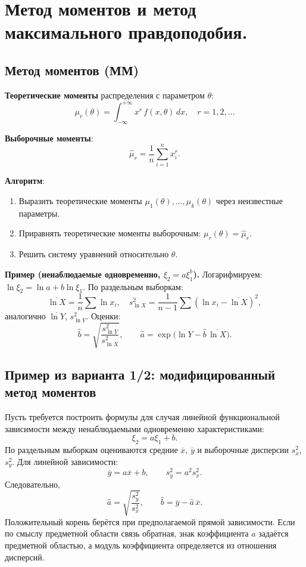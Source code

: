 \section{Метод моментов и метод максимального правдоподобия.}

\subsection*{Метод моментов (ММ)}

\textbf{Теоретические моменты} распределения с параметром $\theta$:
\[
  \mu_r(\theta) = \int_{-\infty}^{+\infty} x^r\,f(x,\theta)\,dx, \quad r = 1, 2, \ldots
\]

\textbf{Выборочные моменты}:
\[
  \hat{\mu}_r = \frac{1}{n}\sum_{i=1}^n x_i^r.
\]

\textbf{Алгоритм}:
\begin{enumerate}
  \item Выразить теоретические моменты $\mu_1(\theta),\ldots,\mu_k(\theta)$ через неизвестные параметры.
  \item Приравнять теоретические моменты выборочным: $\mu_r(\theta) = \hat{\mu}_r$.
  \item Решить систему уравнений относительно $\theta$.
\end{enumerate}

\textbf{Пример (ненаблюдаемые одновременно, $\xi_2 = a\xi_1^{b}$).}
Логарифмируем: $\ln\xi_2 = \ln a + b\ln\xi_1$. По раздельным выборкам:
\[
  \overline{\ln X} = \frac{1}{n}\sum \ln x_i, \quad
  s^2_{\ln X} = \frac{1}{n-1}\sum(\ln x_i - \overline{\ln X})^2,
\]
аналогично $\overline{\ln Y}$, $s^2_{\ln Y}$. Оценки:
\[
  \hat b = \sqrt{\frac{s^2_{\ln Y}}{s^2_{\ln X}}}, \qquad
  \hat a = \exp\!\bigl(\overline{\ln Y} - \hat b\,\overline{\ln X}\bigr).
\]

\subsection*{Пример из варианта 1/2: модифицированный метод моментов}

Пусть требуется построить формулы для случая линейной функциональной зависимости между ненаблюдаемыми одновременно характеристиками:
\[
  \xi_2 = a\xi_1 + b.
\]
По раздельным выборкам оцениваются средние $\overline{x}$, $\overline{y}$ и выборочные дисперсии $s_x^2$, $s_y^2$. Для линейной зависимости:
\[
  \overline{y} = a\overline{x} + b, \qquad
  s_y^2 = a^2s_x^2.
\]
Следовательно,
\[
  \hat a = \sqrt{\frac{s_y^2}{s_x^2}}, \qquad
  \hat b = \overline{y} - \hat a\,\overline{x}.
\]
Положительный корень берётся при предполагаемой прямой зависимости. Если по смыслу предметной области связь обратная, знак коэффициента $a$ задаётся предметной областью, а модуль коэффициента определяется из отношения дисперсий.

